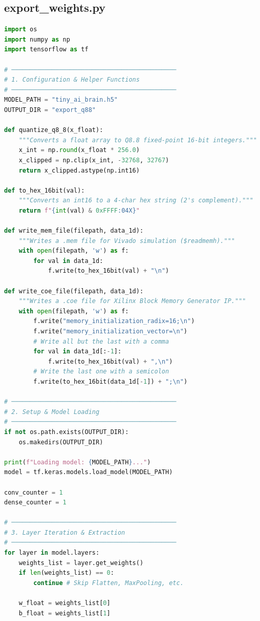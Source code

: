 \subsection{export_weights.py}
\begin{lstlisting}[language=Python]
import os
import numpy as np
import tensorflow as tf

# ─────────────────────────────────────────────
# 1. Configuration & Helper Functions
# ─────────────────────────────────────────────
MODEL_PATH = "tiny_ai_brain.h5"
OUTPUT_DIR = "export_q88"

def quantize_q8_8(x_float):
    """Converts a float array to Q8.8 fixed-point 16-bit integers."""
    x_int = np.round(x_float * 256.0)
    x_clipped = np.clip(x_int, -32768, 32767)
    return x_clipped.astype(np.int16)

def to_hex_16bit(val):
    """Converts an int16 to a 4-char hex string (2's complement)."""
    return f"{int(val) & 0xFFFF:04X}"

def write_mem_file(filepath, data_1d):
    """Writes a .mem file for Vivado simulation ($readmemh)."""
    with open(filepath, 'w') as f:
        for val in data_1d:
            f.write(to_hex_16bit(val) + "\n")

def write_coe_file(filepath, data_1d):
    """Writes a .coe file for Xilinx Block Memory Generator IP."""
    with open(filepath, 'w') as f:
        f.write("memory_initialization_radix=16;\n")
        f.write("memory_initialization_vector=\n")
        # Write all but the last with a comma
        for val in data_1d[:-1]:
            f.write(to_hex_16bit(val) + ",\n")
        # Write the last one with a semicolon
        f.write(to_hex_16bit(data_1d[-1]) + ";\n")

# ─────────────────────────────────────────────
# 2. Setup & Model Loading
# ─────────────────────────────────────────────
if not os.path.exists(OUTPUT_DIR):
    os.makedirs(OUTPUT_DIR)

print(f"Loading model: {MODEL_PATH}...")
model = tf.keras.models.load_model(MODEL_PATH)

conv_counter = 1
dense_counter = 1

# ─────────────────────────────────────────────
# 3. Layer Iteration & Extraction
# ─────────────────────────────────────────────
for layer in model.layers:
    weights_list = layer.get_weights()
    if len(weights_list) == 0:
        continue # Skip Flatten, MaxPooling, etc.

    w_float = weights_list[0]
    b_float = weights_list[1]
    

\end{lstlisting}
